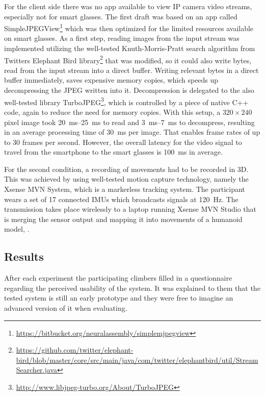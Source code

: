 For the client side there was no app available to view IP camera video streams, especially not for smart glasses. The first draft was based on an app called SimpleJPEGView\footnote{\url{https://bitbucket.org/neuralassembly/simplemjpegview}} which was then optimized for the limited resources available on smart glasses. As a first step, reading images from the input stream was implemented utilizing the well-tested Knuth-Morris-Pratt search algorithm from Twitters Elephant Bird library\footnote{\url{https://github.com/twitter/elephant-bird/blob/master/core/src/main/java/com/twitter/elephantbird/util/StreamSearcher.java}} that was modified, so it could also write bytes, read from the input stream into a direct buffer. Writing relevant bytes in a direct buffer immediately, saves expensive memory copies, which speeds up decompressing the JPEG written into it. Decompression is delegated to the also well-tested library TurboJPEG\footnote{\url{http://www.libjpeg-turbo.org/About/TurboJPEG}}, which is controlled by a piece of native C++ code, again to reduce the need for memory copies. With this setup, a $320 \times 240$ pixel image took \SIrange{20}{25}{\ms} to read and \SIrange{3}{7}{\ms} to decompress, resulting in an average processing time of \SI{30}{\ms} per image. That enables frame rates of up to 30 frames per second. However, the overall latency for the video signal to travel from the smartphone to the smart glasses is \SI{100}{\ms} in average.



For the second condition, a recording of movements had to be recorded in 3D. This was achieved by using well-tested motion capture technology, namely the Xsense MVN System, which is a markerless tracking system. The participant wears a set of 17 connected IMUs which broadcasts signals at \SI{120}{\Hz}. The transmission takes place wirelessly to a laptop running Xsense MVN Studio that is merging the sensor output and mapping it into movements of a humanoid model, \cf {}. 

\subsection{Results}

After each experiment the participating climbers filled in a questionnaire regarding the perceived usability of the system. It was explained to them that the tested system is still an early prototype and  they were free to imagine an advanced version of it when evaluating.

